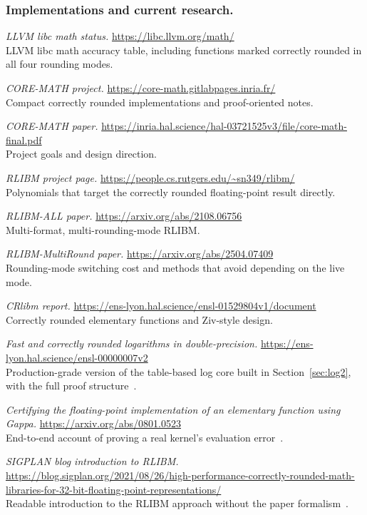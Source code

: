 \documentclass[manuscript, nonacm]{acmart}
\begin{document}
    \subsubsection{Implementations and current research.}

    \emph{LLVM libc math status.}
    \url{https://libc.llvm.org/math/}\\
    LLVM libc math accuracy table, including functions marked correctly rounded
    in all four rounding modes.

    \emph{CORE-MATH project.}
    \url{https://core-math.gitlabpages.inria.fr/}\\
    Compact correctly rounded implementations and proof-oriented notes.

    \emph{CORE-MATH paper.}
    \url{https://inria.hal.science/hal-03721525v3/file/core-math-final.pdf}\\
    Project goals and design direction.

    \emph{RLIBM project page.}
    \url{https://people.cs.rutgers.edu/~sn349/rlibm/}\\
    Polynomials that target the correctly rounded floating-point result directly.

    \emph{RLIBM-ALL paper.}
    \url{https://arxiv.org/abs/2108.06756}\\
    Multi-format, multi-rounding-mode RLIBM.

    \emph{RLIBM-MultiRound paper.}
    \url{https://arxiv.org/abs/2504.07409}\\
    Rounding-mode switching cost and methods that avoid depending on the live
    mode.

    \emph{CRlibm report.}
    \url{https://ens-lyon.hal.science/ensl-01529804v1/document}\\
    Correctly rounded elementary functions and Ziv-style design.

    \emph{Fast and correctly rounded logarithms in double-precision.}
    \url{https://ens-lyon.hal.science/ensl-00000007v2}\\
    Production-grade version of the table-based log core built in
    Section~\ref{sec:log2}, with the full proof structure~\cite{dinechinlog}.

    \emph{Certifying the floating-point implementation of an elementary
    function using Gappa.}
    \url{https://arxiv.org/abs/0801.0523}\\
    End-to-end account of proving a real kernel's evaluation
    error~\cite{gappacert}.

    \emph{SIGPLAN blog introduction to RLIBM.}
    \url{https://blog.sigplan.org/2021/08/26/high-performance-correctly-rounded-math-libraries-for-32-bit-floating-point-representations/}\\
    Readable introduction to the RLIBM approach without the paper
    formalism~\cite{rlibmblog}.
\end{document}
